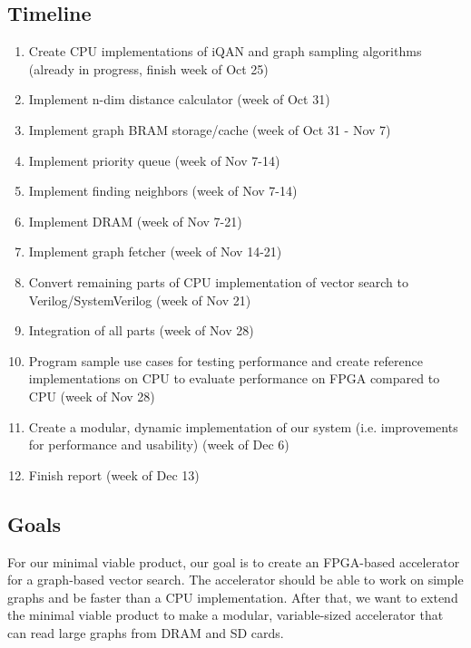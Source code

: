 \documentclass{article}
\begin{document}
\subsection{Timeline}
\begin{enumerate}
    \item Create CPU implementations of iQAN and graph sampling algorithms (already in progress, finish week of Oct 25)
    \item Implement n-dim distance calculator (week of Oct 31)
    \item Implement graph BRAM storage/cache (week of Oct 31 - Nov 7)
    \item Implement priority queue (week of Nov 7-14)
    \item Implement finding neighbors (week of Nov 7-14)
    \item Implement DRAM (week of Nov 7-21)
    \item Implement graph fetcher (week of Nov 14-21) %
    \item Convert remaining parts of CPU implementation of vector search to Verilog/SystemVerilog (week of Nov 21)
    \item Integration of all parts (week of Nov 28)
    \item  Program sample use cases for testing performance and create reference implementations on CPU to evaluate performance on FPGA compared to CPU (week of Nov 28)
    \item Create a modular, dynamic implementation of our system (i.e. improvements for performance and usability) (week of Dec 6)
    \item Finish report (week of Dec 13)
\end{enumerate}



\subsection{Goals}
For our minimal viable product, our goal is to create an FPGA-based accelerator for a graph-based vector search. The accelerator should be able to work on simple graphs and be faster than a CPU implementation. After that, we want to extend the minimal viable product to make a modular, variable-sized accelerator that can read large graphs from DRAM and SD cards.
\end{document}
